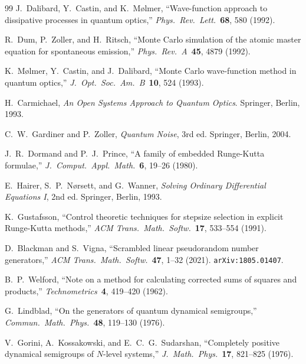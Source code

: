 \documentclass[11pt,a4paper,twoside]{book}
\theoremstyle{definition}
\theoremstyle{remark}
\begin{document}
\begin{thebibliography}{99}
  J.~Dalibard, Y.~Castin, and K.~M\o{}lmer,
  ``Wave-function approach to dissipative processes in quantum optics,''
  \emph{Phys.\ Rev.\ Lett.}\ \textbf{68}, 580 (1992).

  R.~Dum, P.~Zoller, and H.~Ritsch,
  ``Monte Carlo simulation of the atomic master equation for spontaneous emission,''
  \emph{Phys.\ Rev.\ A}\ \textbf{45}, 4879 (1992).

  K.~M\o{}lmer, Y.~Castin, and J.~Dalibard,
  ``Monte Carlo wave-function method in quantum optics,''
  \emph{J.\ Opt.\ Soc.\ Am.\ B}\ \textbf{10}, 524 (1993).

  H.~Carmichael,
  \emph{An Open Systems Approach to Quantum Optics}.
  Springer, Berlin, 1993.

  C.~W.~Gardiner and P.~Zoller,
  \emph{Quantum Noise}, 3rd ed.
  Springer, Berlin, 2004.

  J.~R.~Dormand and P.~J.~Prince,
  ``A family of embedded Runge-Kutta formulae,''
  \emph{J.\ Comput.\ Appl.\ Math.}\ \textbf{6}, 19--26 (1980).

  E.~Hairer, S.~P.~N\o{}rsett, and G.~Wanner,
  \emph{Solving Ordinary Differential Equations I}, 2nd ed.
  Springer, Berlin, 1993.

  K.~Gustafsson,
  ``Control theoretic techniques for stepsize selection in explicit Runge-Kutta methods,''
  \emph{ACM Trans.\ Math.\ Softw.}\ \textbf{17}, 533--554 (1991).

  D.~Blackman and S.~Vigna,
  ``Scrambled linear pseudorandom number generators,''
  \emph{ACM Trans.\ Math.\ Softw.}\ \textbf{47}, 1--32 (2021).
  \texttt{arXiv:1805.01407}.

  B.~P.~Welford,
  ``Note on a method for calculating corrected sums of squares and products,''
  \emph{Technometrics}\ \textbf{4}, 419--420 (1962).

  G.~Lindblad,
  ``On the generators of quantum dynamical semigroups,''
  \emph{Commun.\ Math.\ Phys.}\ \textbf{48}, 119--130 (1976).

  V.~Gorini, A.~Kossakowski, and E.~C.~G.~Sudarshan,
  ``Completely positive dynamical semigroups of $N$-level systems,''
  \emph{J.\ Math.\ Phys.}\ \textbf{17}, 821--825 (1976).
\end{thebibliography}

\end{document}
